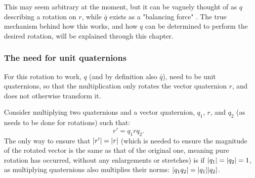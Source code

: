 \documentclass[10pt]{article}
\begin{document}
This may seem arbitrary at the moment, but it can be vaguely thought of as $q$ describing a rotation on $r$, while $\bar{q}$ exists as a "balancing force" \cite{Eater}. The true mechanism behind how this works, and how $q$ can be determined to perform the desired rotation, will be explained through this chapter.

\subsubsection{The need for unit quaternions} \label{NormMultProof}

For this rotation to work, $q$ (and by definition also $\bar{q}$), need to be unit quaternions, so that the multiplication only rotates the vector quaternion $r$, and does not otherwise transform it.

Consider multiplying two quaternions and a vector quaternion, $q_1$, $r$, and $q_2$ (as needs to be done for rotations) such that:
\begin{equation}
    r' = q_1rq_2.
\end{equation}
The only way to ensure that $\abs{r'} = \abs{r}$ (which is needed to ensure the magnitude of the rotated vector is the same as that of the original one, meaning pure rotation has occurred, without any enlargements or stretches) is if $\abs{q_1} = \abs{q_2} = 1$, as multiplying quaternions also multiplies their norms: $\abs{q_1q_2} = \abs{q_1}\abs{q_2}$.
\end{document}
